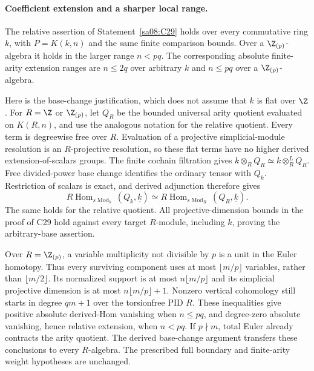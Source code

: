 \paragraph{Coefficient extension and a sharper local range.}
The relative assertion of Statement~\ref{sa08:C29} holds over every
commutative ring $k$, with $P=K(k,n)$ and the same finite comparison
bounds. Over a $\Z_{(p)}$-algebra it holds in the larger range $n<pq$.
The corresponding absolute finite-arity extension ranges are
$n\leq2q$ over arbitrary $k$ and $n\leq pq$ over a
$\Z_{(p)}$-algebra.

Here is the base-change justification, which does not assume that $k$
is flat over $\Z$. For $R=\Z$ or $\Z_{(p)}$, let $Q_R$ be the
bounded universal arity quotient evaluated on $K(R,n)$, and use the
analogous notation for the relative quotient. Every term is degreewise
free over $R$. Evaluation of a projective simplicial-module resolution
is an $R$-projective resolution, so these flat terms have no higher
derived extension-of-scalars groups. The finite cochain filtration gives
$k\otimes_R Q_R\simeq k\otimes_R^LQ_R$. Free divided-power base
change identifies the ordinary tensor with $Q_k$. Restriction of
scalars is exact, and derived adjunction therefore gives
\[
 R\operatorname{Hom}_{s\operatorname{Mod}_k}(Q_k,\underline k)
 \simeq
 R\operatorname{Hom}_{s\operatorname{Mod}_R}(Q_R,\underline k).
\]
The same holds for the relative quotient. All projective-dimension
bounds in the proof of C29 hold against every target $R$-module,
including $k$, proving the arbitrary-base assertion.

Over $R=\Z_{(p)}$, a variable multiplicity not divisible by $p$ is
a unit in the Euler homotopy. Thus every surviving component uses
at most $\lfloor m/p\rfloor$ variables, rather than
$\lfloor m/2\rfloor$. Its normalized support is at most
$n\lfloor m/p\rfloor$ and its simplicial projective dimension is
at most $n\lfloor m/p\rfloor+1$. Nonzero vertical cohomology still
starts in degree $qm+1$ over the torsionfree PID $R$.
These inequalities give positive absolute derived-Hom vanishing
when $n\leq pq$, and degree-zero absolute vanishing, hence relative
extension, when $n<pq$. If $p\nmid m$, total Euler already contracts
the arity quotient. The derived base-change argument transfers these
conclusions to every $R$-algebra. The prescribed full boundary and
finite-arity weight hypotheses are unchanged.
